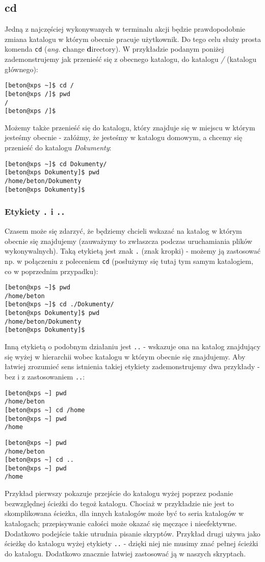 \subsection{cd}
Jedną z najczęściej wykonywanych w terminalu akcji będzie prawdopodobnie zmiana katalogu w którym obecnie pracuje użytkownik. Do tego celu służy prosta komenda \texttt{cd} (\textit{ang.} \textbf{c}hange \textbf{d}irectory). W przykładzie podanym poniżej zademonstrujemy jak przenieść się z obecnego katalogu, do katalogu \textit{/} (katalogu głównego):
\begin{verbatim}
[beton@xps ~]$ cd /
[beton@xps /]$ pwd
/
[beton@xps /]$ 
\end{verbatim}
Możemy także przenieść się do katalogu, który znajduje się w miejscu w którym jesteśmy obecnie - załóżmy, że jesteśmy w katalogu domowym, a chcemy się przenieść do katalogu \textit{Dokumenty}:
\begin{verbatim}
[beton@xps ~]$ cd Dokumenty/
[beton@xps Dokumenty]$ pwd
/home/beton/Dokumenty
[beton@xps Dokumenty]$
\end{verbatim}

\subsubsection{Etykiety \texttt{.} i \texttt{..}}
Czasem może się zdarzyć, że będziemy chcieli wskazać na katalog w którym obecnie się znajdujemy (zauważymy to zwłaszcza podczas uruchamiania plików wykonywalnych). Taką etykietą jest znak \texttt{.} (znak kropki) - możemy ją zastosować np. w połączeniu z poleceniem \texttt{cd} (posłużymy się tutaj tym samym katalogiem, co w poprzednim przypadku):
\begin{verbatim}
[beton@xps ~]$ pwd
/home/beton
[beton@xps ~]$ cd ./Dokumenty/
[beton@xps Dokumenty]$ pwd
/home/beton/Dokumenty
[beton@xps Dokumenty]$ 
\end{verbatim}
Inną etykietą o podobnym działaniu jest \texttt{..} - wskazuje ona na katalog znajdujący się wyżej w hierarchii wobec katalogu w którym obecnie się znajdujemy. Aby łatwiej zrozumieć sens istnienia takiej etykiety zademonstrujemy dwa przykłady - bez i z zastosowaniem \texttt{..}:
\begin{verbatim}
[beton@xps ~] pwd
/home/beton
[beton@xps ~] cd /home
[beton@xps ~] pwd
/home
\end{verbatim}
\begin{verbatim}
[beton@xps ~] pwd
/home/beton
[beton@xps ~] cd ..
[beton@xps ~] pwd
/home
\end{verbatim}
Przykład pierwszy pokazuje przejście do katalogu wyżej poprzez podanie bezwzględnej ścieżki do tegoż katalogu. Chociaż w przykładzie nie jest to skomplikowana ścieżka, dla innych katalogów może być to seria katalogów w katalogach; przepisywanie całości może okazać się męczące i nieefektywne. Dodatkowo podejście takie utrudnia pisanie skryptów.
\newline
\newline
Przykład drugi używa jako ścieżkę do katalogu wyżej etykiety \texttt{..} - dzięki niej nie musimy znać pełnej ścieżki do katalogu. Dodatkowo znacznie łatwiej zastosować ją w naszych skryptach.

